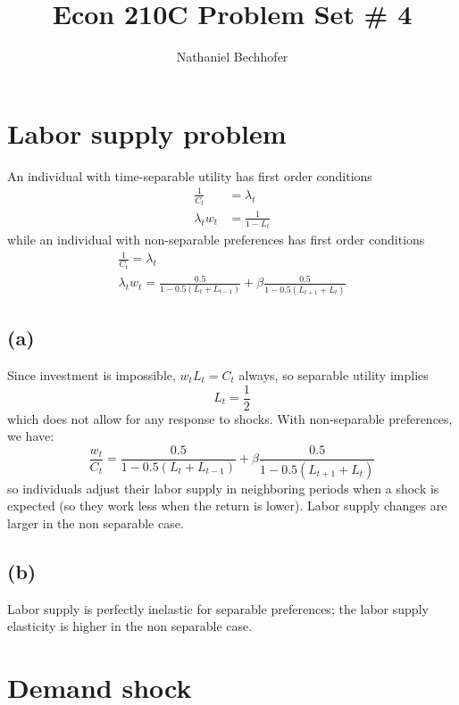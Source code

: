 \documentclass[11pt]{amsart}
\title{Econ 210C Problem Set \# 4}
\author{Nathaniel Bechhofer}
\begin{document}
\maketitle

\section{Labor supply problem}
An individual with time-separable utility has first order conditions
\begin{align*}
\frac{1}{C_t} &= \lambda_t  \\
\lambda_t w_t &= \frac{1}{1-L_t} 
\end{align*}
while an individual with non-separable preferences has first order conditions
\begin{gather*}
\frac{1}{C_t} = \lambda_t  \\
\lambda_t w_t = \frac{0.5}{1 - 0.5 \left( L_t + L_{t-1} \right)} + \beta \frac{0.5}{1 - 0.5 \left( L_{t+1} + L_t \right)}
\end{gather*}
\subsection*{(a)}
	Since investment is impossible, $w_t L_t = C_t$ always, so separable utility implies 
	\begin{equation*}
	L_t = \frac{1}{2}
	\end{equation*}
	which does not allow for any response to shocks. 
	With non-separable preferences, we have:
	\begin{equation*}
	\frac{w_t}{C_t}  = \frac{0.5}{1 - 0.5 \left( L_t + L_{t-1} \right)} + \beta \frac{0.5}{1 - 0.5 \left( L_{t+1} + L_t \right)}
	\end{equation*}
	so individuals adjust their labor supply in neighboring periods when a shock is expected (so they work less when the return is lower).
	Labor supply changes are larger in the non separable case. 
	
\subsection*{(b)} 
Labor supply is perfectly inelastic for separable preferences; the labor supply elasticity is higher in the non separable case. 

\section{Demand shock}
\end{document}
